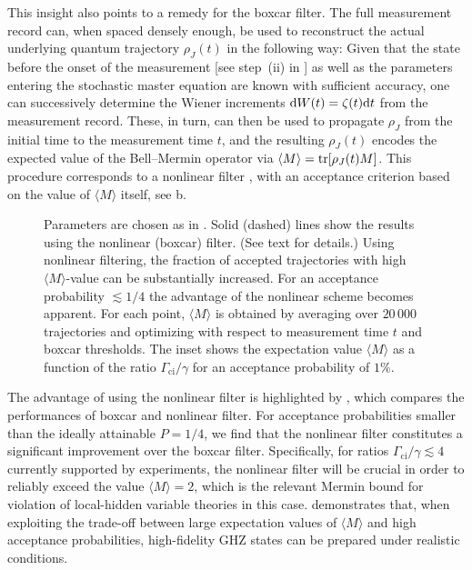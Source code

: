 This insight also points to a remedy for the boxcar filter. The full measurement record can, when spaced densely enough, be used to reconstruct the actual underlying quantum trajectory $\rho_J(t)$ in the following way: Given that the state before the onset of the measurement [see step~(ii) in ] as well as the parameters entering the stochastic master equation are known with sufficient accuracy, one can successively determine the Wiener increments $\mathrm{d} W(t) = \zeta(t)\mathrm{d} t$ from the measurement record. These, in turn, can then be used to propagate $\rho_J$ from the initial time to the measurement time $t$, and the resulting $\rho_J(t)$ encodes the expected value of the Bell--Mermin operator via $\langle M \rangle =\operatorname{tr} [\rho_J(t)M]$. This procedure corresponds to a nonlinear filter \cite{gambetta_protocols_2007}, with an acceptance criterion based on the value of $\langle M \rangle$ itself, see b.

\begin{figure}
\centering
{}
\caption[Expectation value of the Mermin operator $ \langle M \rangle$ as a function of acceptance probability]
{
  Parameters are chosen as in . Solid (dashed) lines show the results using the nonlinear (boxcar) filter. (See text for details.) Using nonlinear filtering, the fraction of accepted trajectories with high $\langle M\rangle$-value can be substantially increased. For an acceptance probability $\lesssim 1/4$ the advantage of the nonlinear scheme becomes apparent. For each point, $\langle M \rangle$ is obtained by averaging over $20\,000$ trajectories and optimizing with respect to measurement time $t$ and boxcar thresholds. The inset shows the expectation value $\langle M \rangle$ as a function of the ratio $\Gamma_\text{ci}/\gamma$ for an acceptance probability of $1\%$.\label{fig:fig4}}
\end{figure}
The advantage of using the nonlinear filter is highlighted by , which compares the performances of boxcar and nonlinear filter. For acceptance probabilities smaller than the ideally attainable $P=1/4$, we find that the nonlinear filter constitutes a significant improvement over the boxcar filter. Specifically, for ratios $\Gamma_\text{ci}/\gamma\lesssim4$ currently supported by experiments, the nonlinear filter will be crucial in order to reliably exceed the value $\langle M \rangle =2$, which is the relevant Mermin bound for violation of local-hidden variable theories in this case.  demonstrates that, when exploiting the trade-off between large expectation values of $\langle M \rangle$ and high acceptance probabilities, high-fidelity GHZ states can be prepared under realistic conditions.


